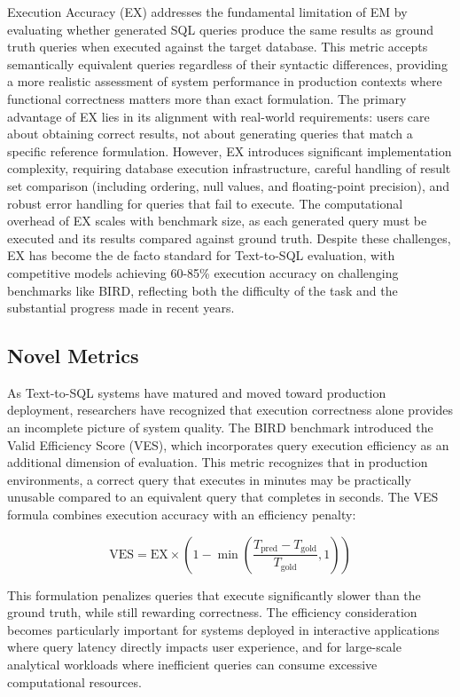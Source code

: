 Execution Accuracy (EX) addresses the fundamental limitation of EM by evaluating whether generated SQL queries produce the same results as ground truth queries when executed against the target database. This metric accepts semantically equivalent queries regardless of their syntactic differences, providing a more realistic assessment of system performance in production contexts where functional correctness matters more than exact formulation. The primary advantage of EX lies in its alignment with real-world requirements: users care about obtaining correct results, not about generating queries that match a specific reference formulation. However, EX introduces significant implementation complexity, requiring database execution infrastructure, careful handling of result set comparison (including ordering, null values, and floating-point precision), and robust error handling for queries that fail to execute. The computational overhead of EX scales with benchmark size, as each generated query must be executed and its results compared against ground truth. Despite these challenges, EX has become the de facto standard for Text-to-SQL evaluation, with competitive models achieving 60-85\% execution accuracy on challenging benchmarks like BIRD, reflecting both the difficulty of the task and the substantial progress made in recent years.

\subsection{Novel Metrics}

As Text-to-SQL systems have matured and moved toward production deployment, researchers have recognized that execution correctness alone provides an incomplete picture of system quality. The BIRD benchmark introduced the Valid Efficiency Score (VES), which incorporates query execution efficiency as an additional dimension of evaluation. This metric recognizes that in production environments, a correct query that executes in minutes may be practically unusable compared to an equivalent query that completes in seconds. The VES formula combines execution accuracy with an efficiency penalty:

\begin{equation}
\text{VES} = \text{EX} \times \left(1 - \min\left(\frac{T_{\text{pred}} - T_{\text{gold}}}{T_{\text{gold}}}, 1\right)\right)
\end{equation}

This formulation penalizes queries that execute significantly slower than the ground truth, while still rewarding correctness. The efficiency consideration becomes particularly important for systems deployed in interactive applications where query latency directly impacts user experience, and for large-scale analytical workloads where inefficient queries can consume excessive computational resources.


